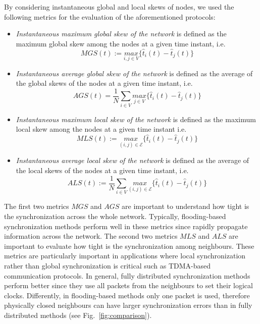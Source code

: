 \documentclass[english,a4paper,10pt,final]{article}
\numberwithin{equation}{section}
\numberwithin{figure}{section}
\begin{document}
By considering instantaneous global and local skews of nodes, we used the following metrics for the evaluation of the aforementioned protocols: 
\begin{itemize}

\item \textit{Instantaneous maximum global skew of the network} is defined as the maximum global skew among the nodes at a given time instant, i.e. $$MGS(t):=\underset{i,j \in V}{max}\lbrace\hat{t}_i(t)-\hat{t}_j(t)\rbrace$$ 

\item \textit{Instantaneous average global skew of the network} is defined as the average of the global skews of the nodes at a given time instant, i.e. $$AGS(t)=\frac{1}{N}\underset{i \in V}{\sum}\underset{j \in V}{max}\lbrace\hat{t}_i(t)-\hat{t}_j(t)\rbrace$$

\item 
\textit{Instantaneous maximum local skew of the network} is defined as the maximum local skew among the nodes at a given time instant i.e. $$MLS(t):=\underset{(i,j) \in \mathcal{E}}{max}\lbrace\hat{t}_i(t)-\hat{t}_j(t)\rbrace$$



\item 
\textit{Instantaneous average local skew of the network} is defined as the average of the local skews of the nodes at a given time instant, i.e. 
$$ALS(t):=\frac{1}{N}\underset{i \in V}{\sum}\underset{(i,j) \in \mathcal{E}}{max}\lbrace\hat{t}_i(t)-\hat{t}_j(t)\rbrace$$
\end{itemize}

The first two metrics $MGS$ and $AGS$ are important to understand how tight is the synchronization across the whole network. Typically, flooding-based synchronization methods perform well in these metrics since rapidly propagate information across the network. The second two metrics $MLS$ and $ALS$ are important to evaluate how tight is the synchronization among neighbours. These metrics are particularly important in applications where local synchronization rather than global synchronization is critical such as TDMA-based communication protocols. In general, fully distributed synchronization  methods perform better since they use all packets from the neighbours to set their logical clocks. Differently, in flooding-based methods only one packet is used, therefore physically closed neighbours can have larger synchronization errors than in fully distributed methods (see Fig.~\ref{fig:comparison}).
\end{document}
